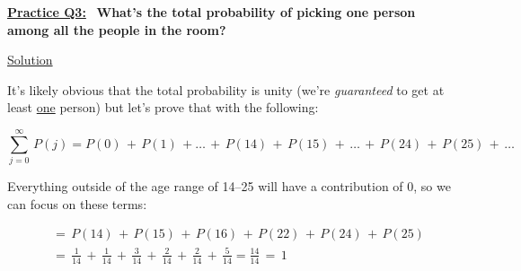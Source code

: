 

\underline{\textbf{Practice Q3:}} \ \textbf{What's the total probability of
picking one person among all the people in the room?}

\bigskip

\underline{Solution}

It's likely obvious that the total probability is unity (we're
\textit{guaranteed} to get at least \underline{one} person) but let's prove
that with the following:

\[
    \sum_{j=0}^{\infty} \, P(j) = P(0) \, + \, P(1) \, + \dots \, + \, P(14) \,
    + \, P(15) \, + \, \dots \, + \, P(24) \, + \, P(25) \, + \, \dots
\]

Everything outside of the age range of 14--25 will have a contribution of 0,
so we can focus on these terms:

\begin{align*}
    &= \, P(14) \, + \, P(15) \, + \, P(16) \, + \, P(22) \, + \, P(24) \, + \,
    P(25) \\[1.5ex]
    &= \, \frac{1}{14} \, + \, \frac{1}{14} \, + \, \frac{3}{14} \, + \,
    \frac{2}{14} \, + \, \frac{2}{14} \, + \, \frac{5}{14} = \frac{14}{14}
    \, = \, \boxed{1}
\end{align*}